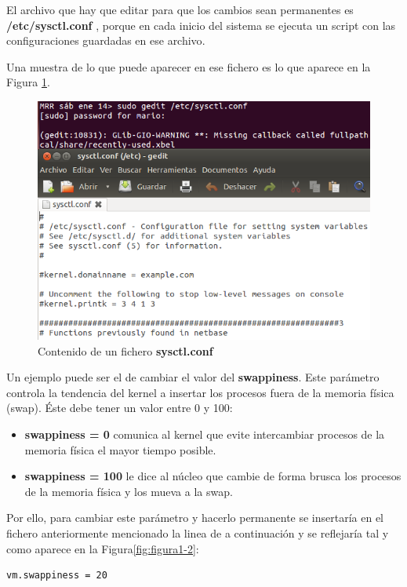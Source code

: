 El archivo que hay que editar para que los cambios sean permanentes es \textbf{/etc/sysctl.conf} \cite{enlace2}, porque en cada inicio del sistema se ejecuta
un script con las configuraciones guardadas en ese archivo\cite{enlace1}. 

Una muestra de lo que puede aparecer en ese fichero es lo que aparece en la Figura \ref{fig:figura1-1}.

\begin{figure}[H] %
	\centering
	\includegraphics[scale=0.7]{figuras/ejercicio1/figura1-1.png} 
	\caption{Contenido de un fichero \textbf{sysctl.conf} } 
	\label{fig:figura1-1}
\end{figure}

Un ejemplo puede ser el de cambiar el valor del \textbf{swappiness}\cite{enlace3}. Este parámetro controla la tendencia del kernel a insertar los procesos
fuera de la memoria física (swap).
Éste debe tener un valor entre 0 y 100:
\begin{itemize}
	\item \textbf{swappiness = 0} comunica al kernel que evite intercambiar procesos de la memoria física
el mayor tiempo posible.
	\item \textbf{swappiness = 100} le dice al núcleo que cambie de forma brusca los procesos de la memoria física y los mueva a la swap.
\end{itemize}

Por ello, para cambiar este parámetro y hacerlo permanente se insertaría en el fichero
anteriormente mencionado\cite{enlace2} la linea de a continuación\cite{enlace3} y se reflejaría tal y como aparece en la Figura\ref{fig:figura1-2}:
\begin{lstlisting}[style=fich]
vm.swappiness = 20
\end{lstlisting}

